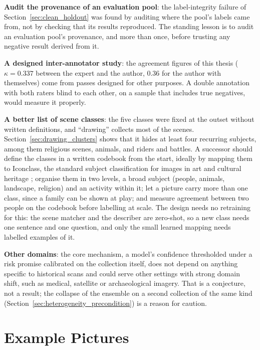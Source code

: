 \documentclass[12pt,a4paper]{report}
\begin{document}
\textbf{Audit the provenance of an evaluation pool}: the label-integrity failure of Section~\ref{sec:clean_holdout} was found by auditing where the pool's labels came from, not by checking that its results reproduced. The standing lesson is to audit an evaluation pool's provenance, and more than once, before trusting any negative result derived from it.

\textbf{A designed inter-annotator study}: the agreement figures of this thesis ($\kappa=0.337$ between the expert and the author, $0.36$ for the author with themselves) come from passes designed for other purposes. A double annotation with both raters blind to each other, on a sample that includes true negatives, would measure it properly.

\textbf{A better list of scene classes}: the five classes were fixed at the outset without written definitions, and ``drawing'' collects most of the scenes. Section~\ref{sec:drawing_clusters} shows that it hides at least four recurring subjects, among them religious scenes, animals, and riders and battles. A successor should define the classes in a written codebook from the start, ideally by mapping them to Iconclass, the standard subject classification for images in art and cultural heritage \cite{iconclass}; organise them in two levels, a broad subject (people, animals, landscape, religion) and an activity within it; let a picture carry more than one class, since a family can be shown at play; and measure agreement between two people on the codebook before labelling at scale. The design needs no retraining for this: the scene matcher and the describer are zero-shot, so a new class needs one sentence and one question, and only the small learned mapping needs labelled examples of it.

\textbf{Other domains}: the core mechanism, a model's confidence thresholded under a risk promise calibrated on the collection itself, does not depend on anything specific to historical scans and could serve other settings with strong domain shift, such as medical, satellite or archaeological imagery. That is a conjecture, not a result; the collapse of the ensemble on a second collection of the same kind (Section~\ref{sec:heterogeneity_precondition}) is a reason for caution.

\appendix
\chapter{Example Pictures}
\label{app:example_pictures}

\end{document}
